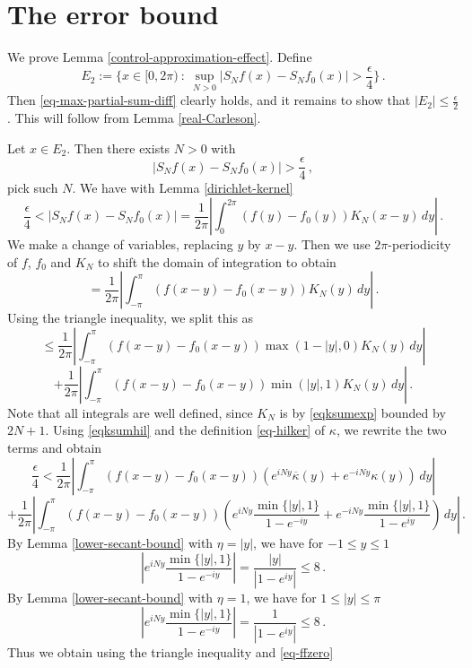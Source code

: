 {\section{The error bound}
\label{10difference}
We prove Lemma \ref{control-approximation-effect}. Define
$$
    E_2 := \{x \in [0, 2\pi) \ : \ \sup_{N > 0} |S_N f(x) - S_N f_0(x)| > \frac{\epsilon}{4} \}\,.
$$
Then \eqref{eq-max-partial-sum-diff} clearly holds, and it remains to show that $|E_2| \le \frac{\epsilon}{2}$. This will follow from Lemma \ref{real-Carleson}.

Let $x \in E_2$. Then there exists $N > 0$ with
$$
    |S_N f(x) - S_N f_0(x)| > \frac{\epsilon}{4}\,,
$$
pick such $N$. We have with Lemma \ref{dirichlet-kernel}
$$
    \frac{\epsilon}{4} < |S_N f(x) - S_N f_0(x)| = \frac{1}{2\pi} \left| \int_0^{2\pi} (f(y) - f_0(y)) K_N(x-y) \, dy\right|\,.
$$
We make a change of variables, replacing $y$ by $x -y$. Then we use $2\pi$-periodicity of $f$, $f_0$ and $K_N$ to shift the domain of integration to obtain
$$
    = \frac{1}{2\pi} \left|\int_{-\pi}^{\pi} (f(x-y) - f_0(x-y)) K_N(y) \, dy\right|\,.
$$
Using the triangle inequality, we split this as
$$
    \le \frac{1}{2\pi} \left|\int_{-\pi}^{\pi} (f(x-y) - f_0(x-y)) \max(1 - |y|, 0) K_N(y) \, dy\right|
$$
$$
    + \frac{1}{2\pi} \left|\int_{-\pi}^{\pi} (f(x-y) - f_0(x-y)) \min(|y|, 1) K_N(y) \, dy\right|\,.
$$
Note that all integrals are well defined, since $K_N$ is by \eqref{eqksumexp} bounded by $2N+1$.
Using \eqref{eqksumhil} and the definition \eqref{eq-hilker} of $\kappa$, we rewrite the two terms and obtain
\begin{equation}
    \label{eq-diff-singular}
    \frac{\epsilon}{4} < \frac{1}{2\pi} \left| \int_{-\pi}^{\pi} (f(x-y) - f_0(x-y)) (e^{iNy} \overline{\kappa}(y) + e^{-iNy}\kappa(y)) \, dy\right|
\end{equation}
\begin{equation}
    \label{eq-diff-integrable}
    + \frac{1}{2\pi} \left|\int_{-\pi}^{\pi} (f(x-y) - f_0(x-y)) ( e^{iNy} \frac{\min\{|y|, 1\} }{1 - e^{-iy}} + e^{-iNy} \frac{\min\{|y|, 1\} }{1 - e^{iy}}) \, dy \right|\,.
\end{equation}
By Lemma \ref{lower-secant-bound} with $\eta = |y|$, we have for $-1 \le y \le 1$
$$
    |e^{iNy}\frac{\min\{|y|, 1\} }{1 - e^{-iy}}| = \frac{|y|}{|1 - e^{iy}|} \le 8\,.
$$
By Lemma \ref{lower-secant-bound} with $\eta = 1$, we have for $1 \le |y| \le \pi$
$$
    |e^{iNy}\frac{\min\{|y|, 1\} }{1 - e^{-iy}}| = \frac{1}{|1 - e^{iy}|} \le 8\,.
$$
Thus we obtain using the triangle inequality and  \eqref{eq-ffzero}
}

